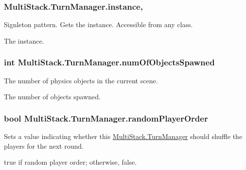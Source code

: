\subsubsection[{instance}]{ Multi\+Stack.\+Turn\+Manager.\+instance\hspace{0.3cm}{\ttfamily [static]}, {\ttfamily [get]}}\label{class_multi_stack_1_1_turn_manager_a7da3b19311001850c30860447304a5b4}


Signleton pattern. Gets the instance. Accessible from any class. 

The instance.\hypertarget{class_multi_stack_1_1_turn_manager_a386f4ecd851d1c9ef639ceaf7d31e439}{}
\subsubsection[{num\+Of\+Objects\+Spawned}]{\setlength{\rightskip}{0pt plus 5cm}int Multi\+Stack.\+Turn\+Manager.\+num\+Of\+Objects\+Spawned\hspace{0.3cm}{\ttfamily [get]}}\label{class_multi_stack_1_1_turn_manager_a386f4ecd851d1c9ef639ceaf7d31e439}


The number of physics objects in the current scene. 

The number of objects spawned.\hypertarget{class_multi_stack_1_1_turn_manager_afbc6bb1a22b590b63ec2b7b496598352}{}
\subsubsection[{random\+Player\+Order}]{\setlength{\rightskip}{0pt plus 5cm}bool Multi\+Stack.\+Turn\+Manager.\+random\+Player\+Order\hspace{0.3cm}{\ttfamily [set]}}\label{class_multi_stack_1_1_turn_manager_afbc6bb1a22b590b63ec2b7b496598352}


Sets a value indicating whether this \hyperlink{class_multi_stack_1_1_turn_manager}{Multi\+Stack.\+Turn\+Manager} should shuffle the players for the next round. 

{\ttfamily true} if random player order; otherwise, {\ttfamily false}.\hypertarget{class_multi_stack_1_1_turn_manager_a951b024c556f17abe670f53ba30089f1}{}

